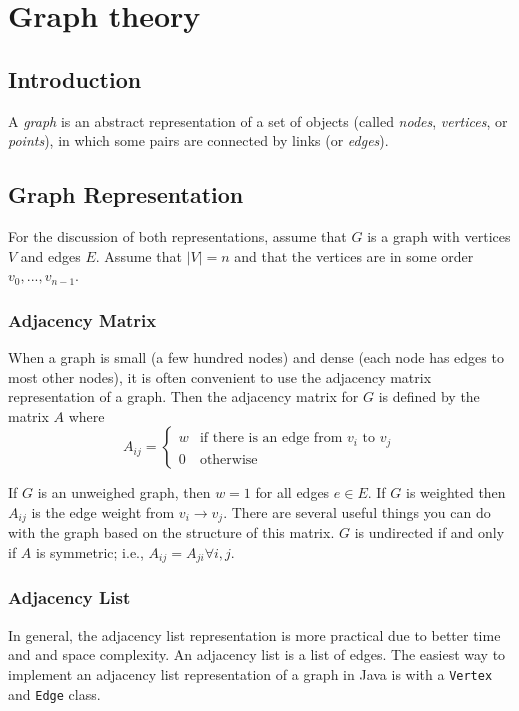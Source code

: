 \documentclass[a4paper,12pt]{article}
\begin{document}
\newpage\section{Graph theory}

\subsection{Introduction}

A {\em graph} is an abstract representation of a set of objects (called {\em nodes}, {\em vertices}, or {\em points}), in which some pairs are connected by links (or {\em edges}).

\subsection{Graph Representation}

For the discussion of both representations, assume that $G$ is a graph with vertices $V$ and edges $E$. Assume that $|V| = n$ and that the vertices are in some order $v_0, ..., v_{n-1}$. 

\subsubsection{Adjacency Matrix}

When a graph is small (a few hundred nodes) and dense (each node has edges to most other nodes), it is often convenient to use the adjacency matrix representation of a graph. Then the adjacency matrix for $G$ is defined by the matrix $A$ where 
\[
A_{ij} = \begin{cases}
w & \text{if there is an edge from $v_i$ to $v_j$} \\
0 & \text{otherwise}
\end{cases}
\]

If $G$ is an unweighed graph, then $w = 1$ for all edges $e \in E$. If $G$ is weighted then $A_{ij}$ is the edge weight from $v_i \to v_j$. There are several useful things you can do with the graph based on the structure of this matrix. $G$ is undirected if and only if $A$ is symmetric; i.e., $A_{ij} = A_{ji} \forall i,j$.

\subsubsection{Adjacency List}

In general, the adjacency list representation is more practical due to better time and and space complexity. An adjacency list is a list of edges. The easiest way to implement an adjacency list representation of a graph in Java is with a \verb|Vertex| and \verb|Edge| class.
\end{document}
